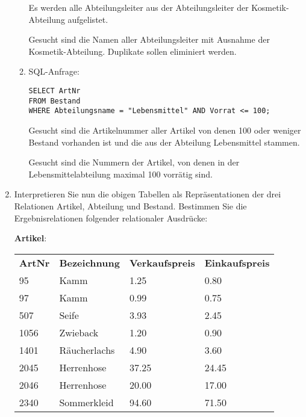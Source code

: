 \documentclass{lehramt-informatik-haupt}
\newcommand{\tmptabelle}[1]{
\bigskip
\par
\noindent
\textbf{#1}:
\bigskip
\par
\noindent
}
\begin{document}
\begin{enumerate}
\begin{enumerate}
\begin{antwort}[richtig]
Es werden alle Abteilungsleiter aus der Abteilungsleiter der
Kosmetik-Abteilung aufgelistet.
\end{antwort}

\begin{antwort}[muster]
Gesucht sind die Namen aller Abteilungsleiter mit Ausnahme der
Kosmetik-Abteilung. Duplikate sollen eliminiert werden.
\end{antwort}


\item SQL-Anfrage:

\begin{verbatim}
SELECT ArtNr
FROM Bestand
WHERE Abteilungsname = "Lebensmittel" AND Vorrat <= 100;
\end{verbatim}

\begin{antwort}[richtig]
Gesucht sind die Artikelnummer aller Artikel von denen 100 oder weniger
Bestand vorhanden ist und die aus der Abteilung Lebensmittel stammen.
\end{antwort}

\begin{antwort}[muster]
Gesucht sind die Nummern der Artikel, von denen in der
Lebensmittelabteilung maximal 100 vorrätig sind.
\end{antwort}

\end{enumerate}

\item Interpretieren Sie nun die obigen Tabellen als Repräsentationen
der drei Relationen Artikel, Abteilung und Bestand. Bestimmen Sie die
Ergebnisrelationen folgender relationaler Ausdrücke:

\tmptabelle{Artikel}

\begin{tabular}{llll}
\textbf{ArtNr} & \textbf{Bezeichnung}  & \textbf{Verkaufspreis} & \textbf{Einkaufspreis} \\
95    & Kamm         & 1.25          & 0.80          \\
97    & Kamm         & 0.99          & 0.75          \\
507   & Seife        & 3.93          & 2.45          \\
1056  & Zwieback     & 1.20          & 0.90          \\
1401  & Räucherlachs & 4.90          & 3.60          \\
2045  & Herrenhose   & 37.25         & 24.45         \\
2046  & Herrenhose   & 20.00         & 17.00         \\
2340  & Sommerkleid  & 94.60         & 71.50
\end{tabular}


\end{enumerate}
\end{document}
